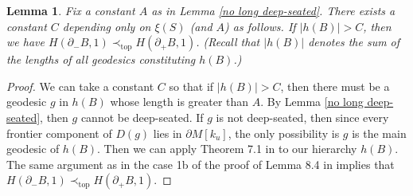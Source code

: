 \documentclass{amsart}
\newtheorem{lemma}[theorem]{Lemma}
\theoremstyle{definition}
\numberwithin{figure}{section}
\numberwithin{equation}{section}
\newcommand{\pretop}{\prec_\mathrm{top}}
\def\cv{\mathcal{V}}
\def\Int{\mathrm{Int}}
\begin{document}
\begin{lemma}
\label{long main geodesic}
Fix a constant $A$ as in Lemma \ref{no long deep-seated}.
There exists a constant $C$ depending only on $\xi(S)$ (and $A$) as follows.
If $|h(B)|> C$, then we have $H(\partial_- B, 1) \pretop H(\partial_+ B,1)$.
(Recall that $|h(B)|$ denotes the sum of the lengths of all geodesics constituting $h(B)$.)
\end{lemma}
\begin{proof}
We can take a constant $C$ so that if $|h(B)|>C$, then there must be a geodesic $g$ in $h(B)$ whose length is greater than $A$.
By Lemma \ref{no long deep-seated}, then $g$ cannot be deep-seated.
If $g$ is not deep-seated, then since every frontier  component of $D(g)$ lies in $\partial M[k_u]$, the only possibility is $g$ is the main geodesic of $h(B)$.
Then we can apply Theorem 7.1 in \cite{bcm} to our hierarchy $h(B)$.
The same argument  as in the case 1b of the proof of Lemma 8.4 in \cite{bcm} implies that $H(\partial_-B,1) \pretop H(\partial_+B,1)$.
\end{proof}
\end{document}
